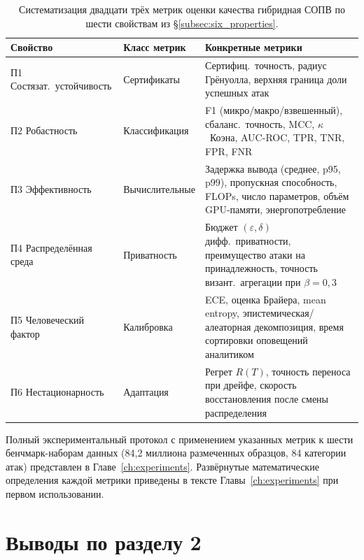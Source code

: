 \begin{table}[H]
\centering
\caption{Систематизация двадцати трёх метрик оценки качества
гибридная СОПВ по шести свойствам из \S\ref{subsec:six_properties}.}
\label{tab:metrics_by_property}
\small
\setlength{\tabcolsep}{4pt}
\begin{tabular}{l p{3.0cm} p{9.3cm}}
\toprule
\textbf{Свойство} & \textbf{Класс метрик} & \textbf{Конкретные метрики} \\
\midrule
П1 Состязат.\ устойчивость & Сертификаты         & Сертифиц.\ точность, радиус Грёнуолла, верхняя граница доли успешных атак \\
\addlinespace
П2 Робастность             & Классификация       & F1 (микро/макро/взвешенный), сбаланс.\ точность, MCC, $\kappa$~Коэна, AUC-ROC, TPR, TNR, FPR, FNR \\
\addlinespace
П3 Эффективность           & Вычислительные      & Задержка вывода (среднее, p95, p99), пропускная способность, FLOPs, число параметров, объём GPU-памяти, энергопотребление \\
\addlinespace
П4 Распределённая среда    & Приватность         & Бюджет $(\varepsilon,\delta)$ дифф.\ приватности, преимущество атаки на принадлежность, точность визант.\ агрегации при $\beta=0{,}3$ \\
\addlinespace
П5 Человеческий фактор     & Калибровка          & ECE, оценка Брайера, mean entropy, эпистемическая/алеаторная декомпозиция, время сортировки оповещений аналитиком \\
\addlinespace
П6 Нестационарность        & Адаптация           & Регрет $R(T)$, точность переноса при дрейфе, скорость восстановления после смены распределения \\
\bottomrule
\end{tabular}
\end{table}

Полный экспериментальный протокол с применением указанных метрик
к шести бенчмарк-наборам данных (84{,}2 миллиона размеченных
образцов, 84 категории атак) представлен в Главе~\ref{ch:experiments}.
Развёрнутые математические определения каждой метрики приведены в
тексте Главы~\ref{ch:experiments} при первом использовании.


\section{Выводы по разделу 2}
\label{sec:ch2_summary}

